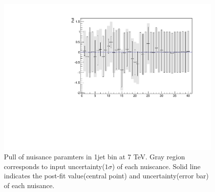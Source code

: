 \begin{figure}[!hbtp]
\centering 
\includegraphics[width=.75\textwidth]{figures/postnuisance_1j_7tev.pdf}
\caption{Pull of nuisance paramters in 1jet bin at 7 TeV.
Gray region corresponds to input uncertainty($1\sigma$) of each nuiscance.
Solid line indicates the post-fit value(central point) and uncertainty(error bar)
of each nuisance.}
\label{fig:nuisance_1j_7tev}
\end{figure} 
